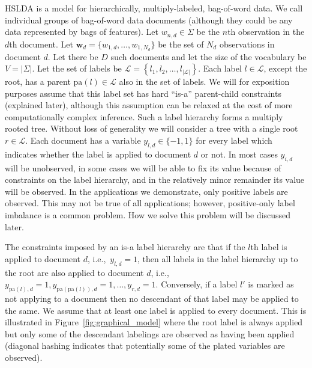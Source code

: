 
\label{sec:model} 

HSLDA is a model for hierarchically, multiply-labeled, bag-of-word data.  We
call individual groups of bag-of-word data documents (although they could be any data represented by bags of features).  Let $w_{n,d}
\in \Sigma$ be the $n$th observation in the $d$th document.  Let $\mathbf{w}_d
= \{w_{1,d},\ldots,w_{1,N_d}\}$ be the  set of $N_d$ observations in document
$d$.  Let there be $D$ such documents and let the size of the vocabulary be
$V=|\Sigma|$.  Let the set of labels be $\mathcal{L}=\left\{
  l_{1},l_{2},\ldots,l_{\left|\mathcal{L}\right|}\right\} $. Each label
$l \in \mathcal{L}$, except the root, has a parent $\mathrm{pa}(l) \in \mathcal{L}$
also in the set of labels. 
 We will for exposition purposes assume that this label set has hard ``is-a''
 parent-child constraints (explained later), although this assumption can be
 relaxed at the cost of more computationally complex inference.  Such a label hierarchy forms a multiply rooted tree.  Without loss of generality we will consider a tree with a single root $r\in\mathcal{L}$.  Each document has a variable $y_{l,d} \in \{-1,1\}$ for every label which indicates whether the label is applied to document $d$ or not.   In most cases $y_{i,d}$ will be unobserved, in some cases we will be able to fix its value because of  constraints on the label hierarchy, and in the relatively minor remainder its value will be observed.  In the applications we demonstrate, only positive labels are observed.   This may not be true of all applications; however, positive-only label imbalance is a common problem.  How we solve this problem will be discussed later.
 
The constraints imposed by an is-a label hierarchy are that if the $l$th label is applied to document $d$, i.e.,~$y_{l,d} = 1$, then all labels in the label hierarchy up to the root are also applied to document $d$, i.e.,~$y_{\mathrm{pa}(l),d} = 1, y_{\mathrm{pa}(\mathrm{pa}(l)),d} = 1, \ldots, y_{r,d}=1.$  Conversely, if a label $l'$ is marked as not applying to a document then no descendant of that label may be applied to the same.   We assume that at least one label is applied to every document.  This is illustrated in Figure~\ref{fig:graphical_model} where the root label is always applied but only some of the descendant labelings are observed as having been applied (diagonal hashing indicates that potentially some of the plated variables are observed).

